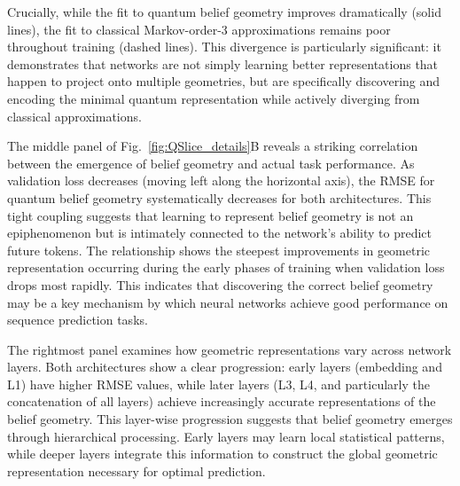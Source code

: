 \documentclass[prx,nofootinbib,onecolumn,showkeys,groupaddress,preprintnumbers,floatfix,
superscriptaddress]{revtex4-1}
\begin{document}
Crucially, while the fit to quantum belief geometry improves dramatically (solid lines), the fit to classical Markov-order-3 approximations remains poor throughout training (dashed lines). This divergence is particularly significant: it demonstrates that networks are not simply learning better representations that happen to project onto multiple geometries, but are specifically discovering and encoding the minimal quantum representation while actively diverging from classical approximations.


The middle panel of Fig.~\ref{fig:QSlice_details}B reveals a striking correlation between the emergence of belief geometry and actual task performance. As validation loss decreases (moving left along the horizontal axis), the RMSE for quantum belief geometry systematically decreases for both architectures. This tight coupling suggests that learning to represent belief geometry is not an epiphenomenon but is intimately connected to the network's ability to predict future tokens. The relationship shows the steepest improvements in geometric representation occurring during the early phases of training when validation loss drops most rapidly. This indicates that discovering the correct belief geometry may be a key mechanism by which neural networks achieve good performance on sequence prediction tasks.


The rightmost panel examines how geometric representations vary across network layers. Both architectures show a clear progression: early layers (embedding and L1) have higher RMSE values, while later layers (L3, L4, and particularly the concatenation of all layers) achieve increasingly accurate representations of the belief geometry. This layer-wise progression suggests that belief geometry emerges through hierarchical processing. Early layers may learn local statistical patterns, while deeper layers integrate this information to construct the global geometric representation necessary for optimal prediction. 

\end{document}
